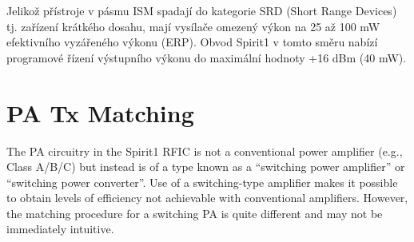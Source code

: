     Jelikož přístroje v pásmu ISM spadají do kategorie SRD (Short Range Devices) tj. zařízení krátkého 
    dosahu, mají vysílače omezený výkon na 25 až 100 mW efektivního vyzářeného výkonu (ERP). Obvod Spirit1 v 
    tomto směru nabízí programové řízení výstupního výkonu do maximální hodnoty +16 dBm (40 mW). 
    

  \section{PA Tx Matching}
    The PA circuitry in the Spirit1 RFIC is not a conventional power amplifier (e.g., Class A/B/C) but 
    instead is of a type known as a “switching power amplifier” or “switching power converter”. Use of a 
    switching-type amplifier makes it possible to obtain levels of efficiency not achievable with 
    conventional amplifiers. However, the matching procedure for a switching PA is quite different and may 
    not be immediately intuitive.
    
